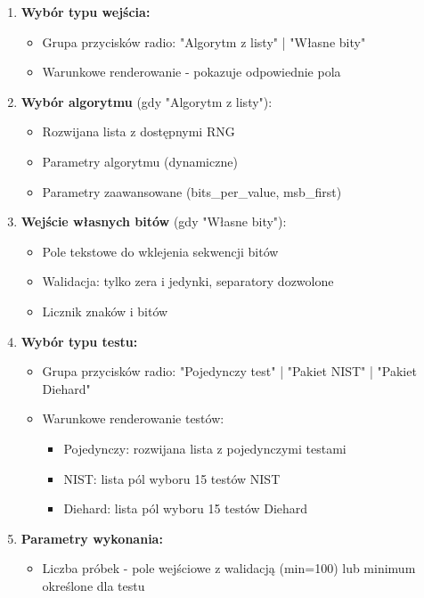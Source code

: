 \documentclass[12pt,a4paper]{article}
\begin{document}
\begin{enumerate}
    \item \textbf{Wybór typu wejścia:}
    \begin{itemize}
        \item Grupa przycisków radio: "Algorytm z listy" | "Własne bity"
        \item Warunkowe renderowanie - pokazuje odpowiednie pola
    \end{itemize}
    
    \item \textbf{Wybór algorytmu} (gdy "Algorytm z listy"):
    \begin{itemize}
        \item Rozwijana lista z dostępnymi RNG
        \item Parametry algorytmu (dynamiczne)
        \item Parametry zaawansowane (bits\_per\_value, msb\_first)
    \end{itemize}
    
    \item \textbf{Wejście własnych bitów} (gdy "Własne bity"):
    \begin{itemize}
        \item Pole tekstowe do wklejenia sekwencji bitów
        \item Walidacja: tylko zera i jedynki, separatory dozwolone
        \item Licznik znaków i bitów
    \end{itemize}
    
    \item \textbf{Wybór typu testu:}
    \begin{itemize}
        \item Grupa przycisków radio: "Pojedynczy test" | "Pakiet NIST" | "Pakiet Diehard"
        \item Warunkowe renderowanie testów:
        \begin{itemize}
            \item Pojedynczy: rozwijana lista z pojedynczymi testami
            \item NIST: lista pól wyboru 15 testów NIST
            \item Diehard: lista pól wyboru 15 testów Diehard
        \end{itemize}
    \end{itemize}
    
    \item \textbf{Parametry wykonania:}
    \begin{itemize}
        \item Liczba próbek - pole wejściowe z walidacją (min=100) lub minimum określone dla testu
    \end{itemize}
\end{enumerate}
\end{document}
